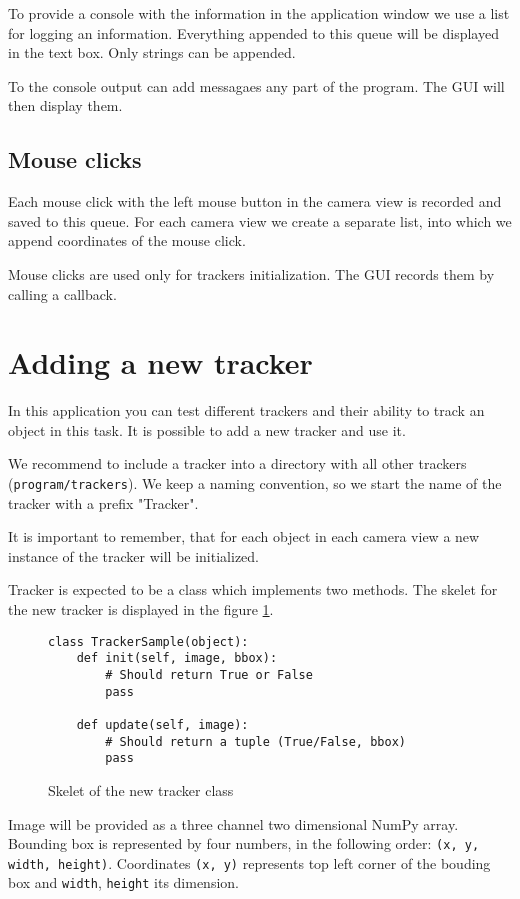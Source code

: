 To provide a console with the information in the application window we use a
list for logging an information. Everything appended to this queue will be
displayed in the text box. Only strings can be appended.

To the console output can add messagaes any part of the program. The GUI will
then display them.

\subsection*{Mouse clicks}

Each mouse click with the left mouse button in the camera view is recorded and
saved to this queue. For each camera view we create a separate list, into which
we append coordinates of the mouse click.

Mouse clicks are used only for trackers initialization. The GUI records them by
calling a callback.

\section{Adding a new tracker}
In this application you can test different trackers and their ability to track
an object in this task. It is possible to add a new tracker and use it.

We recommend to include a tracker into a directory with all other trackers
(\verb+program/trackers+). We keep a naming convention, so we start the name of
the tracker with a prefix "Tracker".

It is important to remember, that for each object in each camera view a new
instance of the tracker will be initialized.

Tracker is expected to be a class which implements two methods. The skelet for
the new tracker is displayed in the figure \ref{fig:new-tracker}.

\begin{figure}
\begin{verbatim}
class TrackerSample(object):
    def init(self, image, bbox):
        # Should return True or False
        pass

    def update(self, image):
        # Should return a tuple (True/False, bbox)
        pass
\end{verbatim}
\caption{Skelet of the new tracker class}
\label{fig:new-tracker}
\end{figure}

Image will be provided as a three channel two dimensional NumPy array. Bounding
box is represented by four numbers, in the following order:
\verb+(x, y, width, height)+. Coordinates \verb+(x, y)+ represents top left corner of the bouding
box and \verb+width+, \verb+height+ its dimension.

